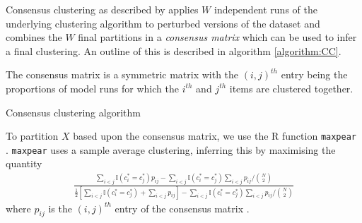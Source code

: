 \documentclass[]{article}
\begin{document}
Consensus clustering as described by \cite{monti2003consensus} applies $W$ independent runs of the underlying clustering algorithm to perturbed versions of the dataset and combines the $W$ final partitions in a \emph{consensus matrix} which can be used to infer a final clustering. An outline of this is described in algorithm \ref{algorithm:CC}. 

The consensus matrix is a symmetric matrix with the $(i, j)^{th}$ entry being the proportions of model runs for which the $i^{th}$ and $j^{th}$ items are clustered together. 

\begin{algorithm} \label{algorithm:CC}
	\caption{Consensus clustering algorithm}
\end{algorithm}

To partition $X$ based upon the consensus matrix, we use the R function \texttt{maxpear} \citep{fritsch2012mcclust}. \texttt{maxpear} uses a sample average clustering, inferring this by maximising the quantity
\begin{align}
	\frac{\sum_{i < j}\mathbb{I}(c_i^* = c_j^*) p_{ij} - \sum_{i < j}\mathbb{I}(c_i^* = c_j^*)\sum_{i < j}p_{ij} / {N \choose 2}}{\frac{1}{2}\left[\sum_{i < j}\mathbb{I}(c_i^* = c_j^*) + \sum_{i < j}p_{ij}\right] - \sum_{i < j}\mathbb{I}(c_i^* = c_j^*)\sum_{i < j}p_{ij} / {N \choose 2}}
\end{align}
where $p_{ij}$ is the $(i,j)^{th}$ entry of the consensus matrix \citep{fritsch2009improved}.
\end{document}
